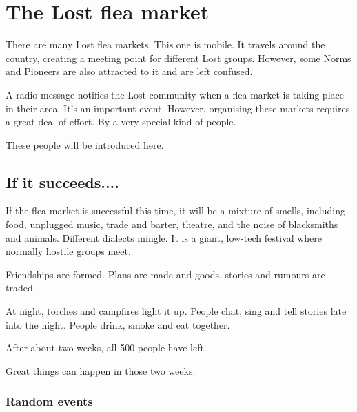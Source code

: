 
\chapter{The Lost flea market}

There are many Lost flea markets. This one is mobile. It travels around the country, creating a meeting point for different Lost groups. However, some Norms and Pioneers are also attracted to it and are left confused.

A radio message notifies the Lost community when a flea market is taking place in their area. It's an important event. However, organising these markets requires a great deal of effort. By a very special kind of people.

These people will be introduced here.

\section{If it succeeds....}

If the flea market is successful this time, it will be a mixture of smells, including food, unplugged music, trade and barter, theatre, and the noise of blacksmiths and animals. Different dialects mingle. It is a giant, low-tech festival where normally hostile groups meet.

Friendships are formed. Plans are made and goods, stories and rumours are traded.

At night, torches and campfires light it up. People chat, sing and tell stories late into the night. People drink, smoke and eat together.

After about two weeks, all 500 people have left.

Great things can happen in those two weeks:

\subsection{Random events}

